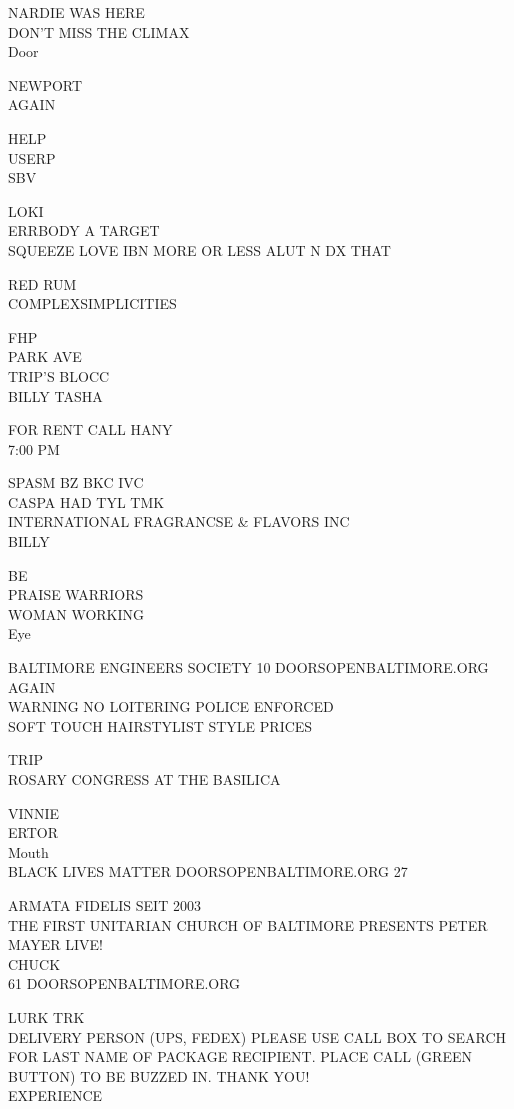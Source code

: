 \documentclass[10pt,letterpaper]{article}
\begin{document}
NARDIE WAS HERE\\
DON'T MISS THE CLIMAX\\
Door

NEWPORT\\
AGAIN

HELP\\
USERP\\
SBV

LOKI\\
ERRBODY A TARGET\\
SQUEEZE LOVE IBN MORE OR LESS ALUT N DX THAT

RED RUM\\
COMPLEXSIMPLICITIES

FHP\\
PARK AVE\\
TRIP'S BLOCC\\
BILLY TASHA

FOR RENT CALL HANY\\
7:00 PM

SPASM BZ BKC IVC\\
CASPA HAD TYL TMK\\
INTERNATIONAL FRAGRANCSE \& FLAVORS INC\\
BILLY

BE\\
PRAISE WARRIORS\\
WOMAN WORKING\\
Eye

BALTIMORE ENGINEERS SOCIETY 10 DOORSOPENBALTIMORE.ORG\\
AGAIN\\
WARNING NO LOITERING POLICE ENFORCED\\
SOFT TOUCH HAIRSTYLIST STYLE PRICES

TRIP\\
ROSARY CONGRESS AT THE BASILICA

VINNIE\\
ERTOR\\
Mouth\\
BLACK LIVES MATTER DOORSOPENBALTIMORE.ORG 27

ARMATA FIDELIS SEIT 2003\\
THE FIRST UNITARIAN CHURCH OF BALTIMORE PRESENTS PETER MAYER LIVE!\\
CHUCK\\
61 DOORSOPENBALTIMORE.ORG

LURK TRK\\
DELIVERY PERSON (UPS, FEDEX) PLEASE USE CALL BOX TO SEARCH FOR LAST NAME OF PACKAGE RECIPIENT.  PLACE CALL (GREEN BUTTON) TO BE BUZZED IN.  THANK YOU!\\
EXPERIENCE
\end{document}

